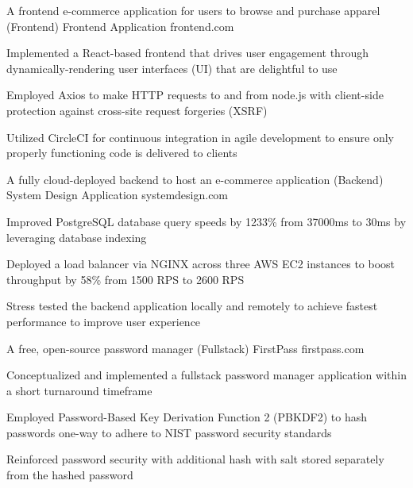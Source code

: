 

\begin{cventries}

  \cventry
    {A frontend e-commerce application for users to browse and purchase apparel (Frontend)} %
    {Frontend Application} %
    {frontend.com} %
    {} %
    {
      \begin{cvitems} %
        \item {Implemented a React-based frontend that drives user engagement through dynamically-rendering user interfaces (UI) that are delightful to use}
        \item {Employed Axios to make HTTP requests to and from node.js with client-side protection against cross-site request forgeries (XSRF)}
        \item {Utilized CircleCI for continuous integration in agile development to ensure only properly functioning code is delivered to clients}
      \end{cvitems}
    }

  \cventry
    {A fully cloud-deployed backend to host an e-commerce application (Backend)} %
    {System Design Application} %
    {systemdesign.com} %
    {} %
    {
      \begin{cvitems} %
        \item {Improved PostgreSQL database query speeds by 1233\% from 37000ms to 30ms by leveraging database indexing}
        \item {Deployed a load balancer via NGINX across three AWS EC2 instances to boost throughput by 58\% from 1500 RPS to 2600 RPS}
        \item {Stress tested the backend application locally and remotely to achieve fastest performance to improve user experience}
      \end{cvitems}
    }

\cventry
{A free, open-source password manager (Fullstack)} %
{FirstPass} %
{firstpass.com} %
{} %
{
  \begin{cvitems} %
    \item {Conceptualized and implemented a fullstack password manager application within a short turnaround timeframe}
    \item {Employed Password-Based Key Derivation Function 2 (PBKDF2) to hash passwords one-way to adhere to NIST password security standards}
    \item {Reinforced password security with additional hash with salt stored separately from the hashed password}
  \end{cvitems}
}


\end{cventries}
